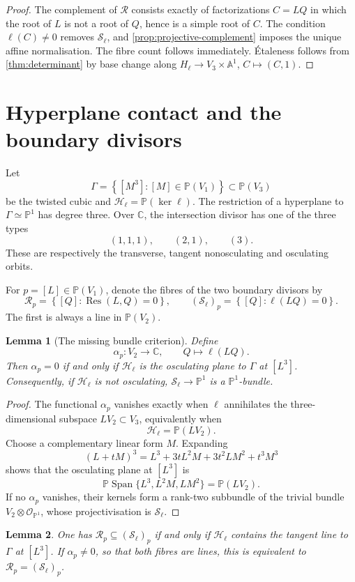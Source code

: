 \documentclass[11pt,reqno]{amsart}
\newtheorem{lemma}[lemma]{Lemma}
\theoremstyle{definition}
\theoremstyle{remark}
\newcommand{\A}{\mathbb A}
\newcommand{\Pj}{\mathbb P}
\newcommand{\C}{\mathbb C}
\newcommand{\OO}{\mathcal O}
\newcommand{\cR}{\mathcal R}
\newcommand{\cS}{\mathcal S}
\newcommand{\cH}{\mathscr H}
\newcommand{\Res}{\operatorname{Res}}
\newcommand{\Span}{\operatorname{Span}}
\newcommand{\set}[1]{\left\{#1\right\}}
\begin{document}
\begin{proof}
The complement of $\cR$ consists exactly of factorizations $C=LQ$ in
which the root of $L$ is not a root of $Q$, hence is a simple root of
$C$.  The condition $\ell(C)\ne0$ removes $\cS_\ell$, and
\cref{prop:projective-complement} imposes the unique affine
normalisation.  The fibre count follows immediately.  Étaleness follows
from \cref{thm:determinant} by base change along
$H_\ell\to V_3\times\A^1$, $C\mapsto(C,1)$.
\end{proof}

\section{Hyperplane contact and the boundary divisors}

Let
\[
 \Gamma=\set{[M^3]:[M]\in\Pj(V_1)}\subset\Pj(V_3)
\]
be the twisted cubic and $\cH_\ell=\Pj(\ker\ell)$.  The restriction of a
hyperplane to $\Gamma\simeq\Pj^1$ has degree three.  Over $\C$, the
intersection divisor has one of the three types
\[
 (1,1,1),\qquad(2,1),\qquad(3).
\]
These are respectively the transverse, tangent nonosculating and
osculating orbits.

For $p=[L]\in\Pj(V_1)$, denote the fibres of the two boundary divisors by
\[
 \cR_p=\set{[Q]:\Res(L,Q)=0},
 \qquad
 (\cS_\ell)_p=\set{[Q]:\ell(LQ)=0}.
\]
The first is always a line in $\Pj(V_2)$.

\begin{lemma}[The missing bundle criterion]\label{lem:S-bundle}
Define
\[
 \alpha_p:V_2\longrightarrow\C,
 \qquad Q\longmapsto\ell(LQ).
\]
Then $\alpha_p=0$ if and only if $\cH_\ell$ is the osculating plane to
$\Gamma$ at $[L^3]$.  Consequently, if $\cH_\ell$ is not osculating,
$\cS_\ell\to\Pj^1$ is a $\Pj^1$-bundle.
\end{lemma}

\begin{proof}
The functional $\alpha_p$ vanishes exactly when $\ell$ annihilates the
three-dimensional subspace $LV_2\subset V_3$, equivalently when
\[
 \cH_\ell=\Pj(LV_2).
\]
Choose a complementary linear form $M$.  Expanding
\[
 (L+tM)^3=L^3+3tL^2M+3t^2LM^2+t^3M^3
\]
shows that the osculating plane at $[L^3]$ is
\[
 \Pj\Span\{L^3,L^2M,LM^2\}=\Pj(LV_2).
\]
If no $\alpha_p$ vanishes, their kernels form a rank-two subbundle of the
trivial bundle $V_2\otimes\OO_{\Pj^1}$, whose projectivisation is
$\cS_\ell$.
\end{proof}

\begin{lemma}\label{lem:tangent-lines}
One has $\cR_p\subseteq(\cS_\ell)_p$ if and only if $\cH_\ell$
contains the tangent line to $\Gamma$ at $[L^3]$.  If
$\alpha_p\ne0$, so that both fibres are lines, this is equivalent to
$\cR_p=(\cS_\ell)_p$.
\end{lemma}
\end{document}
